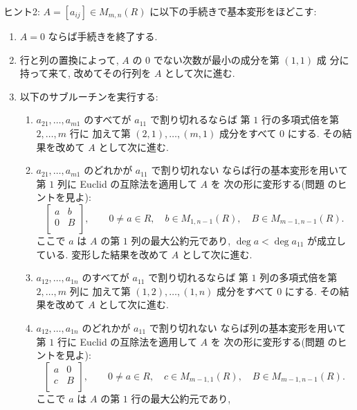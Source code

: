 \documentclass[12pt,twoside]{jarticle}
\begin{document}
\medskip
\noindent
ヒント2: $A=[a_{ij}]\in M_{m,n}(R)$ に以下の手続きで基本変形をほどこす:
\begin{enumerate}
\item $A=0$ ならば手続きを終了する.
\item 行と列の置換によって, $A$ の $0$ でない次数が最小の成分を第 $(1,1)$ 成
  分に持って来て, 改めてその行列を $A$ として次に進む.
\item 以下のサブルーチンを実行する:
  \begin{enumerate}
  \item $a_{21},\dots,a_{m1}$ のすべてが $a_{11}$ で割り切れるならば
    第 $1$ 行の多項式倍を第 $2,\dots,m$ 行に
    加えて第 $(2,1),\dots,(m,1)$ 成分をすべて $0$ にする.
    その結果を改めて $A$ として次に進む.
  \item $a_{21},\dots,a_{m1}$ のどれかが $a_{11}$ で割り切れない
    ならば行の基本変形を用いて第 $1$ 列に Euclid の互除法を適用して $A$ を
    次の形に変形する(問題  のヒントを見よ):
    \begin{equation*}
      \begin{bmatrix}
        a & b \\
        0 & B \\
      \end{bmatrix},
      \qquad
      0\ne a\in R,\quad
      b\in M_{1,n-1}(R),\quad 
      B\in M_{m-1,n-1}(R).
    \end{equation*}
    ここで $a$ は $A$ の第 $1$ 列の最大公約元であり, 
    $\deg a<\deg a_{11}$ が成立している.
    変形した結果を改めて $A$ として次に進む.
  \item $a_{12},\dots,a_{1n}$ のすべてが $a_{11}$ で割り切れるならば
    第 $1$ 列の多項式倍を第 $2,\dots,m$ 列に
    加えて第 $(1,2),\dots,(1,n)$ 成分をすべて $0$ にする.
    その結果を改めて $A$ として次に進む.
  \item $a_{12},\dots,a_{1n}$ のどれかが $a_{11}$ で割り切れない
    ならば列の基本変形を用いて第 $1$ 行に Euclid の互除法を適用して $A$ を
    次の形に変形する(問題  のヒントを見よ):
    \begin{equation*}
      \begin{bmatrix}
        a & 0 \\
        c & B \\
      \end{bmatrix},
      \qquad
      0\ne a\in R,\quad
      c\in M_{m-1,1}(R),\quad 
      B\in M_{m-1,n-1}(R).
    \end{equation*}
    ここで $a$ は $A$ の第 $1$ 行の最大公約元であり, 

\end{enumerate}
\end{enumerate}
\end{document}
